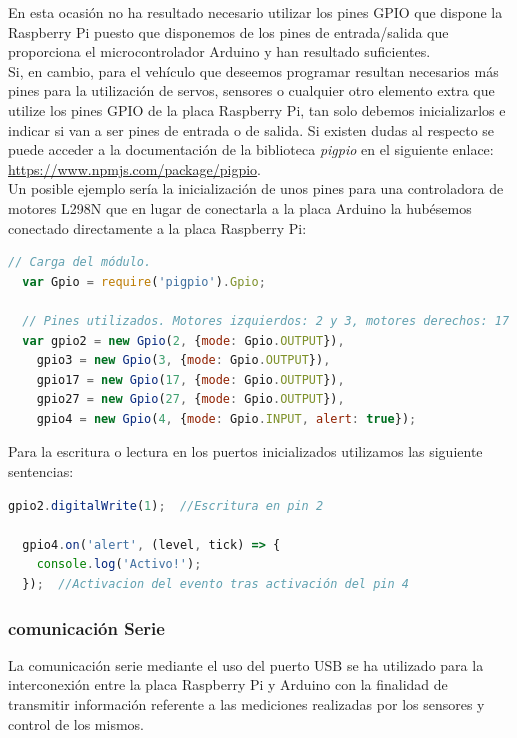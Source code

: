 En esta ocasión no ha resultado necesario utilizar los pines GPIO que dispone la Raspberry Pi puesto que disponemos de los pines de entrada/salida que proporciona
el microcontrolador Arduino y han resultado suficientes.\\

Si, en cambio, para el vehículo que deseemos programar resultan necesarios más pines para la utilización de servos, sensores o cualquier otro elemento extra que utilize los pines
GPIO de la placa Raspberry Pi, tan solo debemos inicializarlos e indicar si van a ser pines de entrada o de salida. Si existen dudas al respecto se puede acceder a la documentación de
la biblioteca \emph{pigpio} en el siguiente enlace: \url{https://www.npmjs.com/package/pigpio}.\\

Un posible ejemplo sería la inicialización de unos pines para una controladora de motores L298N que en lugar de conectarla a la placa Arduino la hubésemos conectado directamente a 
la placa Raspberry Pi:\\

\begin{lstlisting}[language=JavaScript]
  // Carga del módulo.
  var Gpio = require('pigpio').Gpio;

  // Pines utilizados. Motores izquierdos: 2 y 3, motores derechos: 17 y 27
  var gpio2 = new Gpio(2, {mode: Gpio.OUTPUT}),
    gpio3 = new Gpio(3, {mode: Gpio.OUTPUT}),
    gpio17 = new Gpio(17, {mode: Gpio.OUTPUT}),
    gpio27 = new Gpio(27, {mode: Gpio.OUTPUT}),
    gpio4 = new Gpio(4, {mode: Gpio.INPUT, alert: true});
\end{lstlisting}


Para la escritura o lectura en los puertos inicializados utilizamos las siguiente sentencias:\\

\begin{lstlisting}[language=JavaScript]
  gpio2.digitalWrite(1);  //Escritura en pin 2
  
  gpio4.on('alert', (level, tick) => {
    console.log('Activo!');
  });  //Activacion del evento tras activación del pin 4
\end{lstlisting}


\subsubsection{comunicación Serie}
\label{subsec:raspberry_serie}

La comunicación serie mediante el uso del puerto USB se ha utilizado para la interconexión entre la placa Raspberry Pi y Arduino con la finalidad de transmitir información referente
a las mediciones realizadas por los sensores y control de los mismos.\\

